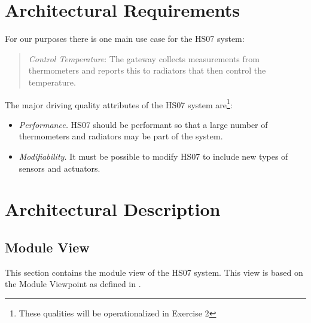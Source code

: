 \documentclass[a4paper,10pt]{article}
\begin{document}
\section{Architectural Requirements}
\label{sec:requirements}

For our purposes there is one main use case for the HS07 system:
\begin{quote}
  \emph{Control Temperature}: The gateway collects measurements from
  thermometers and reports this to radiators that then control the
  temperature.
\end{quote}

The major driving quality attributes of the HS07 system
are\footnote{These qualities will be operationalized in Exercise 2}:

\begin{itemize}
\item \emph{Performance.} HS07 should be performant so that a large
  number of thermometers and radiators may be part of the system.
\item \emph{Modifiability.} It must be possible to modify HS07 to
  include new types of sensors and actuators.
\end{itemize}


\section{Architectural Description}

\subsection{Module View}

This section contains the module view of the HS07 system. This view
is based on the Module Viewpoint as defined in \cite{christensen2004archdesc}.
\end{document}

